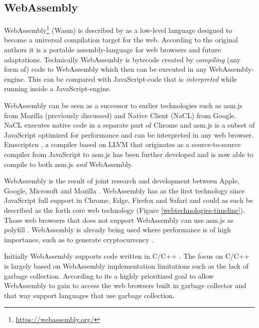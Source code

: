 \subsection{WebAssembly}

WebAssembly\footnote{\url{https://webassembly.org/}} (Wasm) is described by \textcite{Watt2018,JangdaPowersGuhaBerger2019} as a low-level language designed to become a universal compilation target for the web. According to the original authors \textcite{HaasRossbergSchuffTitzerHolmanGohmanWagnerZakaiBastien2017} it is a portable assembly-language for web browsers and future adaptations. Technically WebAssembly is bytecode created by \emph{compiling} (any form of) code to WebAssembly \parencite{Watt2018} which then can be executed in any WebAssembly-engine. This can be compared with JavaScript-code that is \emph{interpreted} while running inside a JavaScript-engine.

WebAssembly can be seen as a successor to earlier technologies such as asm.js from Mozilla (previously discussed) and Native Client (NaCL) from Google. NaCL executes native code in a separate part of Chrome and asm.js  \parencite{Zakai2018} is a subset of JavaScript optimized for performance \parencite{VanEsNicolayStievenartDHondtDeRoover2016} and can be interpreted in any web browser. Emscripten \parencite{Zakai2011}, a compiler based on LLVM \parencite{LattnerAdve2014} that originates as a source-to-source compiler from JavaScript to asm.js \parencite{Zakai2011} has been further developed \parencite{HaasRossbergSchuffTitzerHolmanGohmanWagnerZakaiBastien2017} and is now able to compile to both asm.js \emph{and} WebAssembly.

WebAssembly is the result of joint research and development between Apple, Google, Microsoft and Mozilla \parencite{HaasRossbergSchuffTitzerHolmanGohmanWagnerZakaiBastien2017}. WebAssembly has as the first technology since JavaScript full support in Chrome, Edge, Firefox and Safari and could as such be described as the forth core web technology (Figure \ref{webtechnologies-timeline}). Those web browsers that does not support WebAssembly can use asm.js as polyfill \parencite{HaasRossbergSchuffTitzerHolmanGohmanWagnerZakaiBastien2017}. WebAssembly is already being used where performance is of high importance, such as to generate cryptocurrency \parencite{RuthZimmermannWolsingHohlfeld2018}.

Initially WebAssembly supports code written in C/C++ \parencite{HaasRossbergSchuffTitzerHolmanGohmanWagnerZakaiBastien2017}. 
The focus on C/C++ is largely based on WebAssembly implementation limitations such as the lack of garbage collection. According to \textcite{HaasRossbergSchuffTitzerHolmanGohmanWagnerZakaiBastien2017} its a highly prioritized goal to allow WebAssembly to gain to access the web browsers built in garbage collector and that way support languages that use garbage collection.

